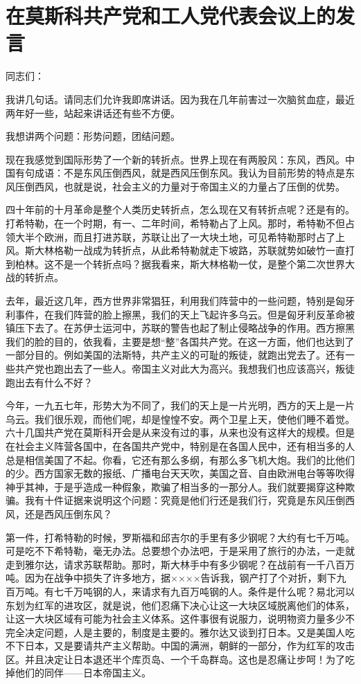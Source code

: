\section[在莫斯科共产党和工人党代表会议上的发言（一九五七年十一月十八日）]{在莫斯科共产党和工人党代表会议上的发言}


同志们：

我讲几句话。请同志们允许我即席讲话。因为我在几年前害过一次脑贫血症，最近两年好一些，站起来讲话还有些不方便。

我想讲两个问题：形势问题，团结问题。

现在我感觉到国际形势了一个新的转折点。世界上现在有两股风：东风，西风。中国有句成语：不是东风压倒西风，就是西风压倒东风。我认为目前形势的特点是东风压倒西风，也就是说，社会主义的力量对于帝国主义的力量占了压倒的优势。

四十年前的十月革命是整个人类历史转折点，怎么现在又有转折点呢？还是有的。打希特勒，在一个时期，有一、二年时间，希特勒占了上风。那时，希特勒不但占领大半个欧洲，而且打进苏联，苏联让出了一大块土地，可见希特勒那时占了上风。斯大林格勒一战成为转折点，从此希特勒就走下坡路，苏联就势如破竹一直打到柏林。这不是一个转折点吗？据我看来，斯大林格勒一仗，是整个第二次世界大战的转折点。

去年，最近这几年，西方世界非常猖狂，利用我们阵营中的一些问题，特别是匈牙利事件，在我们阵营的脸上擦黑，我们的天上飞起许多乌云。但是匈牙利反革命被镇压下去了。在苏伊士运河中，苏联的警告也起了制止侵略战争的作用。西方擦黑我们的脸的目的，依我看，主要是想“整”各国共产党。在这一方面，他们也达到了一部分目的。例如美国的法斯特，共产主义的可耻的叛徒，就跑出党去了。还有一些共产党也跑出去了一些人。帝国主义对此大为高兴。我想我们也应该高兴，叛徒跑出去有什么不好？

今年，一九五七年，形势大为不同了，我们的天上是一片光明，西方的天上是一片乌云。我们很乐观，而他们呢，却是惶惶不安。两个卫星上天，使他们睡不着觉。六十几国共产党在莫斯科开会是从来没有过的事，从来也没有这样大的规模。但是在社会主义阵营各国中，在各国共产党中，特别是在各国人民中，还有相当多的人总是相信美国了不起。你看，它还有那么多纲，有那么多飞机大炮。我们的比他们的少。西方国家无数的报纸、广播电台天天吹，美国之音、自由欧洲电台等等吹得神乎其神，于是乎造成一种假象，欺骗了相当多的一那分人。我们就要揭穿这种欺骗。我有十件证据来说明这个问题：究竟是他们行还是我们行，究竟是东风压倒西风，还是西风压倒东风？

第一件，打希特勒的时候，罗斯福和邱吉尔的手里有多少钢呢？大约有七千万吨。可是吃不下希特勒，毫无办法。总要想个办法吧，于是采用了旅行的办法，一走就走到雅尔达，请求苏联帮助。那时，斯大林手中有多少钢呢？在战前有一千八百万吨。因为在战争中损失了许多地方，据××××告诉我，钢产打了个对折，剩下九百万吨。有七千万吨钢的人，来请求有九百万吨钢的人。条件是什么呢？易北河以东划为红军的进攻区，就是说，他们忍痛下决心让这一大块区域脱离他们的体系，让这一大块区域有可能为社会主义体系。这件事很有说服力，说明物资力量多少不完全决定问题，人是主要的，制度是主要的。雅尔达又谈到打日本。又是美国人吃不下日本，又是要请共产主义帮助。中国的满洲，朝鲜的一部分，作为红军的攻击区。并且决定让日本退还半个库页岛、一个千岛群岛。这也是忍痛让步呵！为了吃掉他们的同伴——日本帝国主义。

